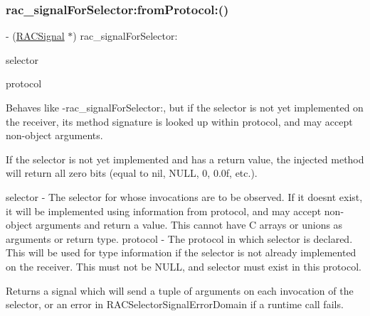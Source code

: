 \subsubsection{\texorpdfstring{rac\+\_\+signal\+For\+Selector\+:from\+Protocol\+:()}{rac\_signalForSelector:fromProtocol:()}\hspace{0.1cm}{\footnotesize\ttfamily [1/3]}}
{\footnotesize\ttfamily -\/ (\mbox{\hyperlink{interface_r_a_c_signal}{R\+A\+C\+Signal}} $\ast$) rac\+\_\+signal\+For\+Selector\+: \begin{DoxyParamCaption}\item[{(S\+EL)}]{selector }\item[{fromProtocol:(Protocol $\ast$)}]{protocol }\end{DoxyParamCaption}}

Behaves like -\/rac\+\_\+signal\+For\+Selector\+:, but if the selector is not yet implemented on the receiver, its method signature is looked up within {\ttfamily protocol}, and may accept non-\/object arguments.

If the selector is not yet implemented and has a return value, the injected method will return all zero bits (equal to {\ttfamily nil}, {\ttfamily N\+U\+LL}, 0, 0.\+0f, etc.).

selector -\/ The selector for whose invocations are to be observed. If it doesn\textquotesingle{}t exist, it will be implemented using information from {\ttfamily protocol}, and may accept non-\/object arguments and return a value. This cannot have C arrays or unions as arguments or return type. protocol -\/ The protocol in which {\ttfamily selector} is declared. This will be used for type information if the selector is not already implemented on the receiver. This must not be {\ttfamily N\+U\+LL}, and {\ttfamily selector} must exist in this protocol.

Returns a signal which will send a tuple of arguments on each invocation of the selector, or an error in R\+A\+C\+Selector\+Signal\+Error\+Domain if a runtime call fails. \mbox{\label{category_n_s_object_07_r_a_c_selector_signal_08_ac1bb0fd410309fd037ae60f81fc8d55b}} 
